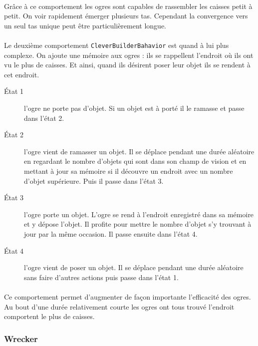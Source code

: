 \paragraph{}Grâce à ce comportement les ogres sont capables de rassembler les caisses
petit à petit. On voir rapidement émerger plusieurs tas. Cependant la
convergence vers un seul tas unique peut être particulièrement longue.

\paragraph{}Le deuxième comportement \texttt{CleverBuilderBahavior} est quand à lui plus
complexe. On ajoute une mémoire aux ogres : ils se rappellent l'endroit où ils ont vu le
plus de caisses. Et ainsi, quand ils désirent poser leur objet ils se rendent à
cet endroit.

\begin{description}
    \item[\'Etat 1] l'ogre ne porte pas d'objet. Si un objet est à porté il
        le ramasse et passe dans l'état 2.
    \item[\'Etat 2] l'ogre vient de ramasser un objet. Il se déplace pendant une
        durée aléatoire en regardant le nombre d'objets qui sont dans son
        champ de vision et en mettant à jour sa mémoire si il découvre un
        endroit avec un nombre d'objet supérieure. Puis il passe dans l'état 3.
    \item[\'Etat 3] l'ogre porte un objet. L'ogre se rend à l'endroit
        enregistré dans sa mémoire et y dépose l'objet. Il profite pour mettre
        le nombre d'objet s'y trouvant à jour par la même occasion. Il passe
        ensuite dans l'état 4.
    \item[\'Etat 4] l'ogre vient de poser un objet. Il se déplace pendant une
        durée aléatoire sans faire d'autres actions puis passe dans l'état 1.
\end{description}

\paragraph{}Ce comportement permet d'augmenter de façon importante l'efficacité
des ogres. Au bout d'une durée relativement courte les ogres ont tous trouvé
l'endroit comportent le plus de caisses.

\subsubsection{Wrecker}
